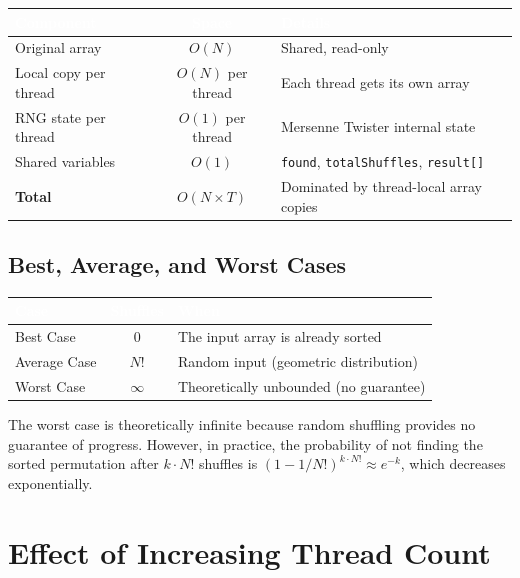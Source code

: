 \documentclass[11pt]{article}
\begin{document}
\begin{center}
\begin{tabular}{|l|c|p{7cm}|}
\hline
\rowcolor{tableheader}
\textcolor{white}{\textbf{Component}} & \textcolor{white}{\textbf{Space}} & \textcolor{white}{\textbf{Details}} \\ \hline
Original array & $O(N)$ & Shared, read-only \\ \hline 
Local copy per thread & $O(N)$ per thread & Each thread gets its own array \\ \hline
RNG state per thread & $O(1)$ per thread & Mersenne Twister internal state \\ \hline
Shared variables & $O(1)$ & \texttt{found}, \texttt{totalShuffles}, \texttt{result[]} \\ \hline
\textbf{Total} & $O(N \times T)$ & Dominated by thread-local array copies \\ \hline
\end{tabular}
\end{center}

\subsection{Best, Average, and Worst Cases}

\begin{center}
\begin{tabular}{|l|c|l|}
\hline
\rowcolor{tableheader}
\textcolor{white}{\textbf{Case}} & \textcolor{white}{\textbf{Shuffles}} & \textcolor{white}{\textbf{When}} \\ \hline
Best Case & $0$ & The input array is already sorted \\ \hline
Average Case & $N!$ & Random input (geometric distribution) \\ \hline
Worst Case & $\infty$ & Theoretically unbounded (no guarantee) \\ \hline
\end{tabular}
\end{center}

The worst case is theoretically infinite because random shuffling provides no guarantee of progress. However, in practice, the probability of not finding the sorted permutation after $k \cdot N!$ shuffles is $(1 - 1/N!)^{k \cdot N!} \approx e^{-k}$, which decreases exponentially.

\newpage

\section{Effect of Increasing Thread Count}
\end{document}
